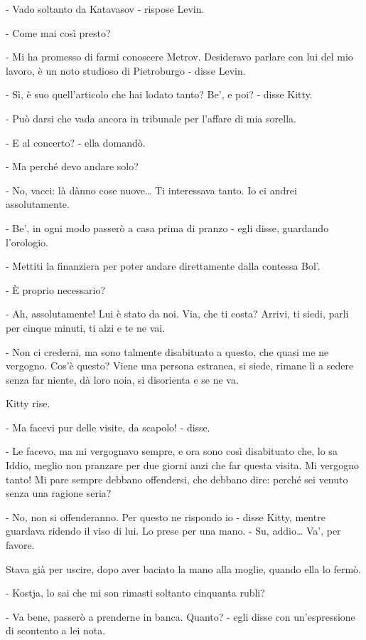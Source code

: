 - Vado soltanto da Katavasov - rispose Levin. 

- Come mai così presto? 

- Mi ha promesso di farmi conoscere Metrov. Desideravo parlare con lui del mio lavoro, è un noto studioso di Pietroburgo - disse Levin. 

- Sì, è suo quell'articolo che hai lodato tanto? Be', e poi? - disse Kitty. 

- Può darsi che vada ancora in tribunale per l'affare di mia sorella. 

- E al concerto? - ella domandò. 

- Ma perché devo andare solo? 

- No, vacci: là dànno cose nuove\ldots{} Ti interessava tanto. Io ci andrei assolutamente. 

- Be', in ogni modo passerò a casa prima di pranzo - egli disse, guardando l'orologio. 

- Mettiti la finanziera per poter andare direttamente dalla contessa Bol'. 

- È proprio necessario? 

- Ah, assolutamente! Lui è stato da noi. Via, che ti costa? Arrivi, ti siedi, parli per cinque minuti, ti alzi e te ne vai. 

- Non ci crederai, ma sono talmente disabituato a questo, che quasi me ne vergogno. Cos'è questo? Viene una persona estranea, si siede, rimane lì a sedere senza far niente, dà loro noia, si disorienta e se ne va. 

Kitty rise. 

- Ma facevi pur delle visite, da scapolo! - disse. 

- Le facevo, ma mi vergognavo sempre, e ora sono così disabituato che, lo sa Iddio, meglio non pranzare per due giorni anzi che far questa visita. Mi vergogno tanto! Mi pare sempre debbano offendersi, che debbano dire: perché sei venuto senza una ragione seria? 

- No, non si offenderanno. Per questo ne rispondo io - disse Kitty, mentre guardava ridendo il viso di lui. Lo prese per una mano. - Su, addio\ldots{} Va', per favore. 

Stava già per uscire, dopo aver baciato la mano alla moglie, quando ella lo fermò. 

- Kostja, lo sai che mi son rimasti soltanto cinquanta rubli? 

- Va bene, passerò a prenderne in banca. Quanto? - egli disse con un'espressione di scontento a lei nota. 

